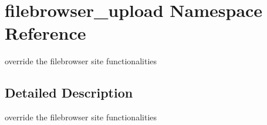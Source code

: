 \hypertarget{namespacefilebrowser__upload}{}\section{filebrowser\+\_\+upload Namespace Reference}
\label{namespacefilebrowser__upload}


override the filebrowser site functionalities  




\subsection{Detailed Description}
override the filebrowser site functionalities 